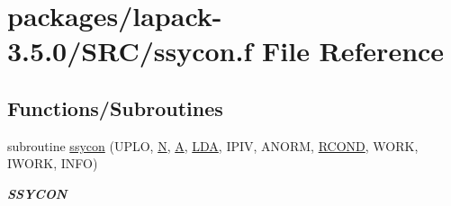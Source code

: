 \hypertarget{ssycon_8f}{}\section{packages/lapack-\/3.5.0/\+S\+R\+C/ssycon.f File Reference}
\label{ssycon_8f}
\subsection*{Functions/\+Subroutines}
\begin{DoxyCompactItemize}
\item 
subroutine \hyperlink{group__realSYcomputational_gab3e2f689a6ee4b436702ace446df4781}{ssycon} (U\+P\+L\+O, \hyperlink{polmisc_8c_a0240ac851181b84ac374872dc5434ee4}{N}, \hyperlink{classA}{A}, \hyperlink{example__user_8c_ae946da542ce0db94dced19b2ecefd1aa}{L\+D\+A}, I\+P\+I\+V, A\+N\+O\+R\+M, \hyperlink{superlu__enum__consts_8h_af00a42ecad444bbda75cde1b64bd7e72a9b5c151728d8512307565994c89919d5}{R\+C\+O\+N\+D}, W\+O\+R\+K, I\+W\+O\+R\+K, I\+N\+F\+O)
\begin{DoxyCompactList}\small\item\em {\bfseries S\+S\+Y\+C\+O\+N} \end{DoxyCompactList}\end{DoxyCompactItemize}
